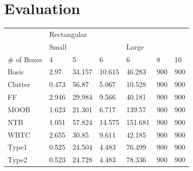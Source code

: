 \documentclass[12pt,a4paper,oneside]{report}
\begin{document}
\chapter{Evaluation}
\begin{table}[]
\begin{tabular}{l|l|l|l|l|l|l|}
\cline{2-7}
                                  & \multicolumn{6}{l|}{Rectangular}                              \\ \cline{2-7} 
                                  & \multicolumn{3}{l|}{Small} & \multicolumn{3}{l|}{Large} \\ \hline
\multicolumn{1}{|l|}{\# of Boxes} & 4      & 5       & 6       & 6          & 8     & 10    \\ \hline
\multicolumn{1}{|l|}{Basic}       & 2.97   & 34.157  & 10.615  & 46.283     & 900   & 900   \\ \hline
\multicolumn{1}{|l|}{Clutter}     & 0.473  & 56.87   & 5.067   & 10.528     & 900   & 900   \\ \hline
\multicolumn{1}{|l|}{FF}          & 2.946  & 29.984  & 9.566   & 40.181     & 900   & 900   \\ \hline
\multicolumn{1}{|l|}{MOOB}        & 1.623  & 21.301  & 6.717   & 139.57     & 900   & 900   \\ \hline
\multicolumn{1}{|l|}{NTB}         & 1.051  & 57.824  & 14.575  & 151.681    & 900   & 900   \\ \hline
\multicolumn{1}{|l|}{WBTC}        & 2.655  & 30.85   & 9.611   & 42.185     & 900   & 900   \\ \hline
\multicolumn{1}{|l|}{Type1}       & 0.525  & 24.504  & 4.483   & 76.499     & 900   & 900   \\ \hline
\multicolumn{1}{|l|}{Type2}       & 0.523  & 24.728  & 4.483   & 78.336     & 900   & 900   \\ \hline
\end{tabular}
\end{table}
\end{document}
